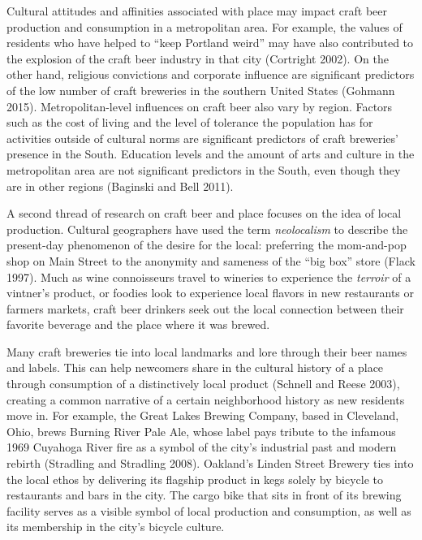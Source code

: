 \documentclass[]{article}
\begin{document}
Cultural attitudes and affinities associated with place may impact craft
beer production and consumption in a metropolitan area. For example, the
values of residents who have helped to ``keep Portland weird'' may have
also contributed to the explosion of the craft beer industry in that
city (Cortright 2002). On the other hand, religious convictions and
corporate influence are significant predictors of the low number of
craft breweries in the southern United States (Gohmann 2015).
Metropolitan-level influences on craft beer also vary by region. Factors
such as the cost of living and the level of tolerance the population has
for activities outside of cultural norms are significant predictors of
craft breweries' presence in the South. Education levels and the amount
of arts and culture in the metropolitan area are not significant
predictors in the South, even though they are in other regions (Baginski
and Bell 2011).

A second thread of research on craft beer and place focuses on the idea
of local production. Cultural geographers have used the term
\emph{neolocalism} to describe the present-day phenomenon of the desire
for the local: preferring the mom-and-pop shop on Main Street to the
anonymity and sameness of the ``big box'' store (Flack 1997). Much as
wine connoisseurs travel to wineries to experience the \emph{terroir} of
a vintner's product, or foodies look to experience local flavors in new
restaurants or farmers markets, craft beer drinkers seek out the local
connection between their favorite beverage and the place where it was
brewed.

Many craft breweries tie into local landmarks and lore through their
beer names and labels. This can help newcomers share in the cultural
history of a place through consumption of a distinctively local product
(Schnell and Reese 2003), creating a common narrative of a certain
neighborhood history as new residents move in. For example, the Great
Lakes Brewing Company, based in Cleveland, Ohio, brews Burning River
Pale Ale, whose label pays tribute to the infamous 1969 Cuyahoga River
fire as a symbol of the city's industrial past and modern rebirth
(Stradling and Stradling 2008). Oakland's Linden Street Brewery ties
into the local ethos by delivering its flagship product in kegs solely
by bicycle to restaurants and bars in the city. The cargo bike that sits
in front of its brewing facility serves as a visible symbol of local
production and consumption, as well as its membership in the city's
bicycle culture.
\end{document}
